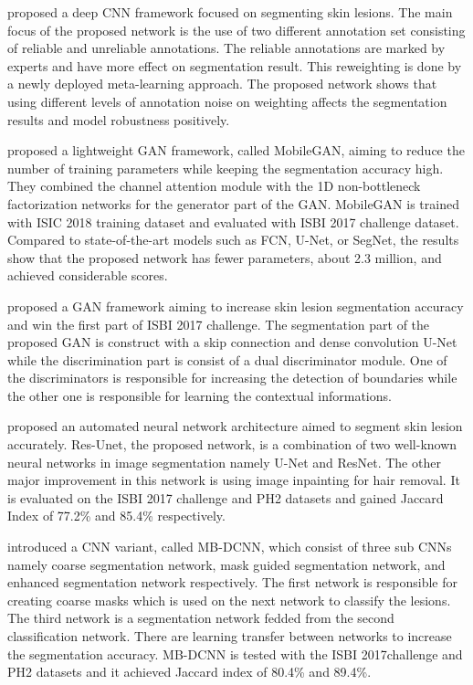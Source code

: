     \citet{mirikharaji2019learning} proposed a deep CNN framework focused on segmenting skin lesions.
    The main focus of the proposed network is the use of two different annotation set consisting of reliable and unreliable annotations.
    The reliable annotations are marked by experts and have more effect on segmentation result. This reweighting is done by a newly deployed meta-learning approach.
    The proposed network shows that using different levels of annotation noise on weighting affects the segmentation results and model robustness positively.

    \citet{sarker2019mobilegan} proposed a lightweight GAN framework, called MobileGAN, aiming to reduce the number of training parameters while keeping the segmentation accuracy high.
    They combined the channel attention module with the 1D non-bottleneck factorization networks for the generator part of the GAN.
    MobileGAN is trained with ISIC 2018 training dataset and evaluated with ISBI 2017 challenge dataset.
    Compared to state-of-the-art models such as FCN, U-Net, or SegNet, the results show that the proposed network has fewer parameters, about 2.3 million, and achieved considerable scores.

    \citet{lei2020skin} proposed a GAN framework aiming to increase skin lesion segmentation accuracy and win the first part of ISBI 2017 challenge.
    The segmentation part of the proposed GAN is construct with a skip connection and dense convolution U-Net while the discrimination part is consist of a dual discriminator module.
    One of the discriminators is responsible for increasing the detection of boundaries while the other one is responsible for learning the contextual informations.

    \citet{zafar2020skin} proposed an automated neural network architecture aimed to segment skin lesion accurately.
    Res-Unet, the proposed network, is a combination of two well-known neural networks in image segmentation namely U-Net and ResNet.
    The other major improvement in this network is using image inpainting for hair removal.
    It is evaluated on the ISBI 2017 challenge and PH2 datasets and gained Jaccard Index of 77.2\% and 85.4\%  respectively.

    \citet{xie2020mutual} introduced a CNN variant, called MB-DCNN, which consist of three sub CNNs namely coarse segmentation network,
    mask guided segmentation network, and enhanced segmentation network respectively.
    The first network is responsible for creating coarse masks which is used on the next network to classify the lesions.
    The third network is a segmentation network fedded from the second classification network.
    There are learning transfer between networks to increase the segmentation accuracy.
    MB-DCNN is tested with the ISBI 2017challenge and PH2 datasets and it achieved Jaccard index of 80.4\% and 89.4\%.

    
